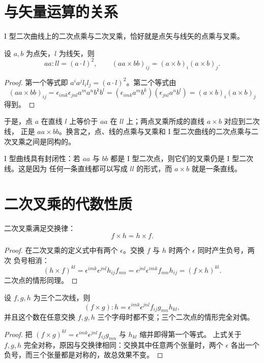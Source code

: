 \section{与矢量运算的关系}

I 型二次曲线上的二次点乘与二次叉乘，恰好就是点矢与线矢的点乘与叉乘。

\begin{proposition}
设 $a,b$ 为点矢，$l$ 为线矢，则
\[
aa:ll=(a\cdot l)^2,\qquad (aa\times bb)_{ij}=(a\times b)_i(a\times b)_j .
\]
\end{proposition}

\begin{proof}
第一个等式即 $a^ia^jl_il_j=(a\cdot l)^2$。第二个等式由
\[
(aa\times bb)_{ij}=\epsilon_{imk}\epsilon_{jnl}a^ma^nb^kb^l
=(\epsilon_{imk}a^mb^k)(\epsilon_{jnl}a^nb^l)
=(a\times b)_i(a\times b)_j
\]
得到。
\end{proof}

于是，点 $a$ 在直线 $l$ 上等价于 $aa$ 在 $ll$ 上；两点叉乘所成的直线 $a\times b$ 对应到二次线，
正是 $aa\times bb$。换言之，点、线的点乘与叉乘和 I 型二次曲线的二次点乘与二次叉乘之间是同构的。

I 型曲线具有封闭性：若 $aa$ 与 $bb$ 都是 I 型二次点，则它们的叉乘仍是 I 型二次线。这是因为
任何一条直线都可以写成 $ll$ 的形式，而 $a\times b$ 就是一条直线。

\section{二次叉乘的代数性质}

\begin{proposition}[交换律]
二次叉乘满足交换律：
\[
f\times h=h\times f .
\]
\end{proposition}

\begin{proof}
在二次叉乘的定义式中有两个 $\epsilon$。交换 $f$ 与 $h$ 时两个 $\epsilon$ 同时产生负号，两次
负号相消：
\[
(h\times f)^{kl}=\epsilon^{imk}\epsilon^{jnl}h_{ij}f_{mn}
=\epsilon^{jnl}\epsilon^{imk}f_{mn}h_{ij}=(f\times h)^{kl}.
\]
二次点的情形同理。
\end{proof}

\begin{proposition}[混合积的全对称性]
设 $f,g,h$ 为三个二次线，则
\[
(f\times g):h=\epsilon^{imk}\epsilon^{jnl}f_{ij}g_{mn}h_{kl},
\]
并且这个数在任意交换 $f,g,h$ 三个字母时都不变；三个二次点的情形完全对偶。
\end{proposition}

\begin{proof}
把 $(f\times g)^{kl}=\epsilon^{imk}\epsilon^{jnl}f_{ij}g_{mn}$ 与 $h_{kl}$ 缩并即得第一个等式。
上式关于 $f,g,h$ 完全对称，原因与交换律相同：交换其中任意两个张量时，两个 $\epsilon$ 各出一个
负号，而三个张量都是对称的，故总效果不变。
\end{proof}

